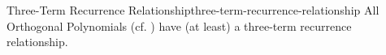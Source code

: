\begin{theorem}{Three-Term Recurrence Relationship}{three-term-recurrence-relationship}
  All Orthogonal Polynomials (cf. ) have (at least) a three-term recurrence relationship.
\end{theorem}

